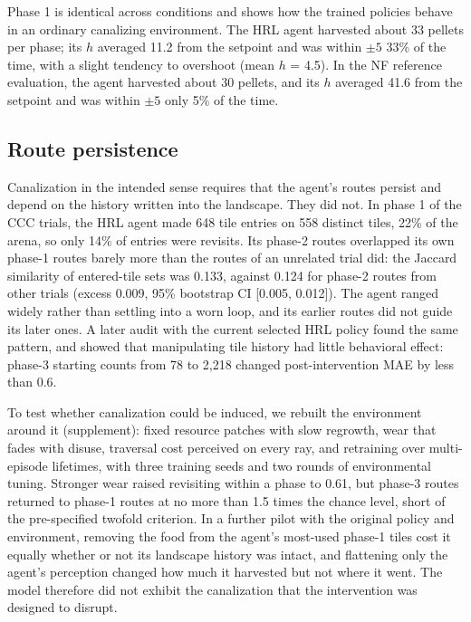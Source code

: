 \documentclass[12pt,fleqn]{article}
\begin{document}
Phase 1 is identical across conditions and shows how the trained policies behave in an ordinary canalizing environment. The HRL agent harvested about 33 pellets per phase; its $h$ averaged 11.2 from the setpoint and was within $\pm5$ 33\% of the time, with a slight tendency to overshoot (mean $h$ = 4.5). In the NF reference evaluation, the agent harvested about 30 pellets, and its $h$ averaged 41.6 from the setpoint and was within $\pm5$ only 5\% of the time.

\subsection{Route persistence}\label{sec:route-analysis}

Canalization in the intended sense requires that the agent's routes persist and depend on the history written into the landscape. They did not. In phase 1 of the CCC trials, the HRL agent made 648 tile entries on 558 distinct tiles, 22\% of the arena, so only 14\% of entries were revisits. Its phase-2 routes overlapped its own phase-1 routes barely more than the routes of an unrelated trial did: the Jaccard similarity of entered-tile sets was 0.133, against 0.124 for phase-2 routes from other trials (excess 0.009, 95\% bootstrap CI [0.005, 0.012]). The agent ranged widely rather than settling into a worn loop, and its earlier routes did not guide its later ones. A later audit with the current selected HRL policy found the same pattern, and showed that manipulating tile history had little behavioral effect: phase-3 starting counts from 78 to 2,218 changed post-intervention MAE by less than 0.6.

To test whether canalization could be induced, we rebuilt the environment around it (supplement): fixed resource patches with slow regrowth, wear that fades with disuse, traversal cost perceived on every ray, and retraining over multi-episode lifetimes, with three training seeds and two rounds of environmental tuning. Stronger wear raised revisiting within a phase to 0.61, but phase-3 routes returned to phase-1 routes at no more than 1.5 times the chance level, short of the pre-specified twofold criterion. In a further pilot with the original policy and environment, removing the food from the agent's most-used phase-1 tiles cost it equally whether or not its landscape history was intact, and flattening only the agent's perception changed how much it harvested but not where it went. The model therefore did not exhibit the canalization that the intervention was designed to disrupt.
\end{document}
